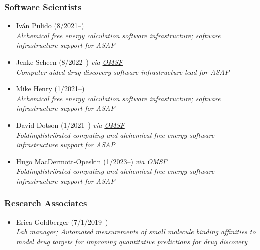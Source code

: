 \documentclass[10pt]{article}
\begin{document}
\subsubsection*{Software Scientists}

\begin{itemize}
  \item Iv\'{a}n Pulido (8/2021--)\\
  \emph{Alchemical free energy calculation software infrastructure; software infrastructure support for ASAP}

  \item Jenke Scheen (8/2022--) \emph{via \href{http://omsf.io}{OMSF}}\\
  \emph{Computer-aided drug discovery software infrastructure lead for ASAP}

  \item Mike Henry (1/2021--)\\
  \emph{Alchemical free energy calculation software infrastructure; software infrastructure support for ASAP}

  \item David Dotson (1/2021--) \emph{via \href{http://omsf.io}{OMSF}}\\
  \emph{Folding\@home distributed computing and alchemical free energy software infrastructure support for ASAP}
  
  \item Hugo MacDermott-Opeskin (1/2023--) \emph{via \href{http://omsf.io}{OMSF}}\\
  \emph{Folding\@home distributed computing and alchemical free energy software infrastructure support for ASAP}
  
\end{itemize}


\subsubsection*{Research Associates}

\begin{itemize}
  \item Erica Goldberger (7/1/2019--)\\
  \emph{Lab manager; Automated measurements of small molecule binding affinities to model drug targets for improving quantitative predictions for drug discovery}

\end{itemize}

\eject
\end{document}
